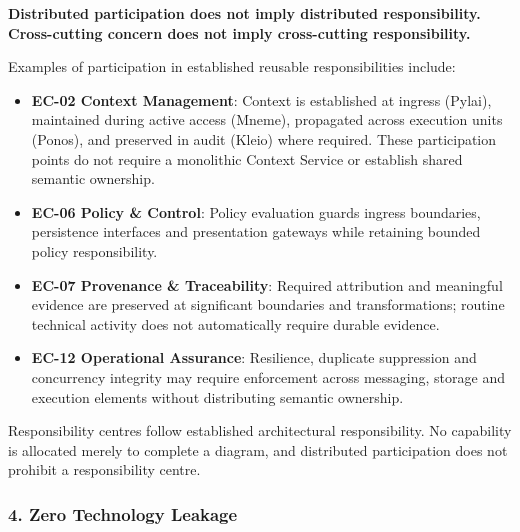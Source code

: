 \label{rad:enterprise:58}

\textbf{Distributed participation does not imply distributed responsibility. Cross-cutting concern does not imply cross-cutting responsibility.}

\label{rad:enterprise:60}

Examples of participation in established reusable responsibilities include:

\label{rad:enterprise:61}

\begin{itemize}

\item 
\textbf{EC-02 Context Management}: Context is established at ingress (Pylai), maintained during active access (Mneme), propagated across execution units (Ponos), and preserved in audit (Kleio) where required. These participation points do not require a monolithic Context Service or establish shared semantic ownership.



\item 
\textbf{EC-06 Policy \& Control}: Policy evaluation guards ingress boundaries, persistence interfaces and presentation gateways while retaining bounded policy responsibility.



\item 
\textbf{EC-07 Provenance \& Traceability}: Required attribution and meaningful evidence are preserved at significant boundaries and transformations; routine technical activity does not automatically require durable evidence.



\item 
\textbf{EC-12 Operational Assurance}: Resilience, duplicate suppression and concurrency integrity may require enforcement across messaging, storage and execution elements without distributing semantic ownership.



\end{itemize}
\label{rad:enterprise:66}

Responsibility centres follow established architectural responsibility. No capability is allocated merely to complete a diagram, and distributed participation does not prohibit a responsibility centre.

\label{rad:enterprise:68}
\subsubsection*{4. Zero Technology Leakage}
\label{rad:enterprise:69}

